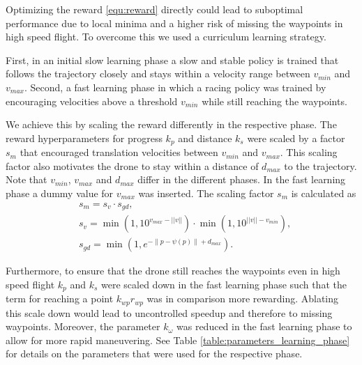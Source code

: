 Optimizing the reward \eqref{equ:reward} directly could lead to suboptimal performance due to local minima and a higher risk of missing the waypoints in high speed flight. To overcome this we used a curriculum learning strategy. 

First, in an initial slow learning phase a slow and stable policy is trained that follows the trajectory closely and stays within a velocity range between $v_{min}$ and $v_{max}$. 
Second, a fast learning phase in which a racing policy was trained by encouraging velocities above a threshold $v_{min}$ while still reaching the waypoints. 

We achieve this by scaling the reward differently in the respective phase. The reward hyperparameters for progress $k_p$ and distance $k_s$ were scaled by a factor $s_m$ that encouraged translation velocities between $v_{min}$ and $v_{max}$. This scaling factor also motivates the drone to stay within a distance of $d_{max}$ to the trajectory. Note that $v_{min}$, $v_{max}$ and $d_{max}$ differ in the different phases. In the fast learning phase a dummy value for $v_{max}$ was inserted. The scaling factor $s_m$ is calculated as
\begin{align*}
     & s_m = s_{v} \cdot s_{gd}, \\
     & s_{v} = \min(1, 10^{v_{max}-||v||}) \cdot \min(1, 10^{||v||-v_{min}}), \\
     & s_{gd} = \min(1,e^{ - \|p - \psi(p) \| + d_{max}}).
\end{align*}

Furthermore, to ensure that the drone still reaches the waypoints even in high speed flight $k_p$ and $k_s$ were scaled down in the fast learning phase such that the term for reaching a point $k_{wp}r_{wp}$ was in comparison more rewarding. Ablating this scale down would lead to uncontrolled speedup and therefore to missing waypoints.  
Moreover, the parameter $k_{\omega}$ was reduced in the fast learning phase to allow for more rapid maneuvering. See Table \ref{table:parameters_learning_phase} for details on the parameters that were used for the respective phase. 


